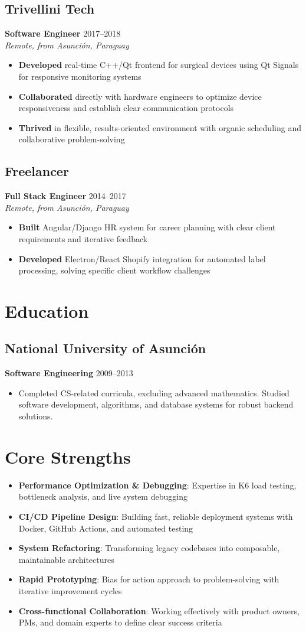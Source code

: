 \documentclass[11pt,a4paper]{article}
\newcommand{\actionverb}[1]{\textcolor{actioncolor}{\textbf{#1}}}
\newcommand{\cvcompany}[3]{
  \subsection{#1 \textcolor{mediumgray}{#2}}
  #3
  \vspace{0.5em}
}
\newcommand{\cvrole}[4]{
  \textbf{#1} \hfill \textcolor{mediumgray}{\small #2}\\
  \textit{#3}
  \begin{itemize}
    #4
  \end{itemize}
  \vspace{1em}
}
\newcommand{\cveducation}[4]{
  \subsection{#1}
  \textbf{#2} \hfill \textcolor{mediumgray}{\small #3}
  \begin{itemize}
    \item #4
  \end{itemize}
}
\begin{document}
\cvcompany{Trivellini Tech}{}{
  \cvrole{Software Engineer}{2017--2018}{Remote, from Asunción, Paraguay}{
    \item \actionverb{Developed} real-time C++/Qt frontend for surgical devices using Qt Signals for responsive monitoring systems
    \item \actionverb{Collaborated} directly with hardware engineers to optimize device responsiveness and establish clear communication protocols
    \item \actionverb{Thrived} in flexible, results-oriented environment with organic scheduling and collaborative problem-solving
  }
}

\cvcompany{Freelancer}{}{
  \cvrole{Full Stack Engineer}{2014--2017}{Remote, from Asunción, Paraguay}{
    \item \actionverb{Built} Angular/Django HR system for career planning with clear client requirements and iterative feedback
    \item \actionverb{Developed} Electron/React Shopify integration for automated label processing, solving specific client workflow challenges
  }
}

\section{Education}

\cveducation{National University of Asunción}{Software Engineering}{2009--2013}{Completed CS-related curricula, excluding advanced mathematics. Studied software development, algorithms, and database systems for robust backend solutions.}

\section{Core Strengths}

\begin{itemize}
  \item \textbf{Performance Optimization \& Debugging}: Expertise in K6 load testing, bottleneck analysis, and live system debugging
  \item \textbf{CI/CD Pipeline Design}: Building fast, reliable deployment systems with Docker, GitHub Actions, and automated testing
  \item \textbf{System Refactoring}: Transforming legacy codebases into composable, maintainable architectures
  \item \textbf{Rapid Prototyping}: Bias for action approach to problem-solving with iterative improvement cycles
  \item \textbf{Cross-functional Collaboration}: Working effectively with product owners, PMs, and domain experts to define clear success criteria
\end{itemize}
\end{document}
